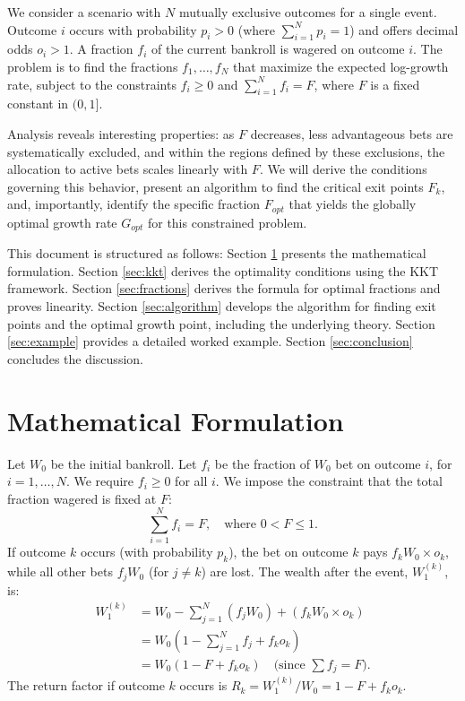 \documentclass[11pt, letterpaper]{article}
\theoremstyle{definition}
\begin{document}
We consider a scenario with $N$ mutually exclusive outcomes for a single event. Outcome $i$ occurs with probability $p_i > 0$ (where $\sum_{i=1}^N p_i = 1$) and offers decimal odds $o_i > 1$. A fraction $f_i$ of the current bankroll is wagered on outcome $i$. The problem is to find the fractions $f_1, \dots, f_N$ that maximize the expected log-growth rate, subject to the constraints $f_i \ge 0$ and $\sum_{i=1}^N f_i = F$, where $F$ is a fixed constant in $(0, 1]$.

Analysis reveals interesting properties: as $F$ decreases, less advantageous bets are systematically excluded, and within the regions defined by these exclusions, the allocation to active bets scales linearly with $F$. We will derive the conditions governing this behavior, present an algorithm to find the critical exit points $F_k$, and, importantly, identify the specific fraction $F_{opt}$ that yields the globally optimal growth rate $G_{opt}$ for this constrained problem.

This document is structured as follows: Section \ref{sec:formulation} presents the mathematical formulation. Section \ref{sec:kkt} derives the optimality conditions using the KKT framework. Section \ref{sec:fractions} derives the formula for optimal fractions and proves linearity. Section \ref{sec:algorithm} develops the algorithm for finding exit points and the optimal growth point, including the underlying theory. Section \ref{sec:example} provides a detailed worked example. Section \ref{sec:conclusion} concludes the discussion.

\section{Mathematical Formulation}
\label{sec:formulation}

Let $W_0$ be the initial bankroll. Let $f_i$ be the fraction of $W_0$ bet on outcome $i$, for $i=1, \dots, N$. We require $f_i \ge 0$ for all $i$. We impose the constraint that the total fraction wagered is fixed at $F$:
\begin{equation}
    \sum_{i=1}^N f_i = F, \quad \text{where } 0 < F \le 1.
\end{equation}
If outcome $k$ occurs (with probability $p_k$), the bet on outcome $k$ pays $f_k W_0 \times o_k$, while all other bets $f_j W_0$ (for $j \neq k$) are lost. The wealth after the event, $W_1^{(k)}$, is:
\begin{align}
    W_1^{(k)} &= W_0 - \sum_{j=1}^N (f_j W_0) + (f_k W_0 \times o_k) \\
              &= W_0 \left( 1 - \sum_{j=1}^N f_j + f_k o_k \right) \\
              &= W_0 (1 - F + f_k o_k) \quad \text{(since } \sum f_j = F \text{)}.
\end{align}
The return factor if outcome $k$ occurs is $R_k = W_1^{(k)} / W_0 = 1 - F + f_k o_k$.
\end{document}
